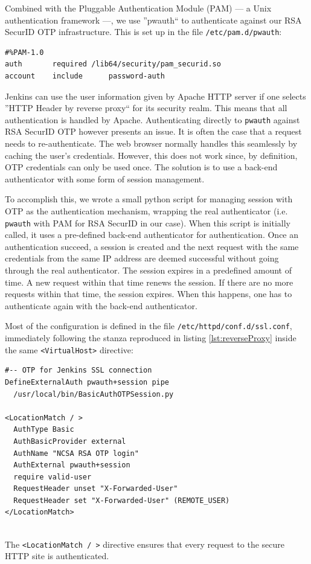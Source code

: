 \documentclass[10pt, conference, compsocconf]{IEEEtran}
\begin{document}
Combined with the Pluggable Authentication Module (PAM) --- a Unix authentication framework ---, we use ''pwauth`` to authenticate against our RSA SecurID OTP infrastructure. 
This is set up in the file \texttt{/etc/pam.d/pwauth}:
\begin{lstlisting}
#%PAM-1.0
auth	   required	/lib64/security/pam_securid.so
account    include      password-auth
\end{lstlisting}

Jenkins can use the user information given by Apache HTTP server if one selects ''HTTP Header by reverse proxy`` for its security realm. 
This means that all authentication is handled by Apache. 
Authenticating directly to \texttt{pwauth} against RSA SecurID OTP however presents an issue. 
It is often the case that a request needs to re-authenticate. 
The web browser normally handles this seamlessly by caching the user's credentials.
However, this does not work since, by definition, OTP credentials can only be used once. 
The solution is to use a back-end authenticator with some form of session management. 

To accomplish this, we wrote a small python script for managing session with OTP \cite{BasicAuthOTPSession} as the authentication mechanism, wrapping the real authenticator (i.e. \texttt{pwauth} with PAM for RSA SecurID in our case). 
When this script is initially called, it uses a pre-defined back-end authenticator for authentication. 
Once an authentication succeed, a session is created and the next request with the same credentials from the same IP address are deemed successful without going through the real authenticator. 
The session expires in a predefined amount of time. 
A new request within that time renews the session. 
If there are no more requests within that time, the session expires.
When this happens, one has to authenticate again with the back-end authenticator. 

Most of the configuration is defined in the file \texttt{/etc/httpd/conf.d/ssl.conf}, immediately following the stanza reproduced in listing \ref{lst:reverseProxy} inside the same \texttt{<VirtualHost>} directive:

\begin{lstlisting}
#-- OTP for Jenkins SSL connection
DefineExternalAuth pwauth+session pipe 
  /usr/local/bin/BasicAuthOTPSession.py

<LocationMatch / > 
  AuthType Basic
  AuthBasicProvider external
  AuthName "NCSA RSA OTP login" 
  AuthExternal pwauth+session
  require valid-user  
  RequestHeader unset "X-Forwarded-User"
  RequestHeader set "X-Forwarded-User" (REMOTE_USER)
</LocationMatch>
 
\end{lstlisting}
The \texttt{<LocationMatch / >} directive ensures that every request to the secure HTTP site is authenticated. 
\end{document}
